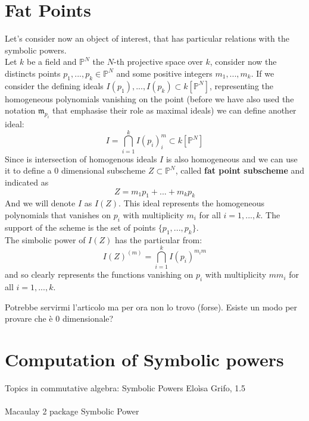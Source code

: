 \documentclass[]{book}
\theoremstyle{plain}
\theoremstyle{remark}
\theoremstyle{definition}
\newcommand{\PP}{\mathbb{P}}
\newcommand{\mm}{\mathfrak{m}}
\begin{document}


\section{Fat Points}

Let's consider now an object of interest, that has particular relations with the symbolic powers.\\
Let $ k $ be a field and $ \PP^N$ the $ N $-th projective space over $ k $, consider now the distincts points $ p_1, ... ,p_k \in  \PP^N$ and some positive integers $ m_1 , ... ,m_k $. If we consider the defining ideals $ I(p_1), ... , I(p_k)  \subset k [\PP^N]$, representing the homogeneous polynomials vanishing on the point (before we have also used the notation $ \mm_{p_i}$ that emphasise their role as maximal ideals) we can define another ideal:
\begin{equation}\label{eq:fat_pt}
	I = \bigcap_{i=1}^k I(p_i)^m_i \subset k [\PP^N]
\end{equation}
Since is intersection of homogenous ideals $ I $ is also homogeneous and we can use it to define a $ 0 $ dimensional subscheme $ Z \subset \PP^N $, called \textbf{fat point subscheme} and indicated as 
\[
Z = m_1 p_1 + ... +  m_k p_k
\]
And we will denote $ I $ as $ I(Z) $. This ideal represents the homogeneous polynomials that vanishes on $ p_i $ with multiplicity $ m_i $ for all $ i = 1, ... , k $. The support of the scheme is the set of points $ \{ p_1 , ... , p_k\} $.\\
The simbolic power of $ I(Z) $ has the particular from:
\[
I(Z)^{(m)} = \bigcap_{i=1}^k I(p_i)^{m_im}
\]
and so clearly represents the functions vanishing on $ p_i $ with multiplicity $ mm_i $ for all $ i = 1, ... , k $. 


\begin{tcolorbox}
Potrebbe servirmi l'articolo \cite{Gimigliano89} ma per ora non lo trovo (forse).
Esiste un modo per provare che è 0 dimensionale? %
\end{tcolorbox}


\section{Computation of Symbolic powers}

\begin{tcolorbox}
Topics in commutative algebra:
Symbolic Powers
Eloìsa Grifo, 1.5 \\
\\
Macaulay 2 package Symbolic Power
\end{tcolorbox}
\end{document}
